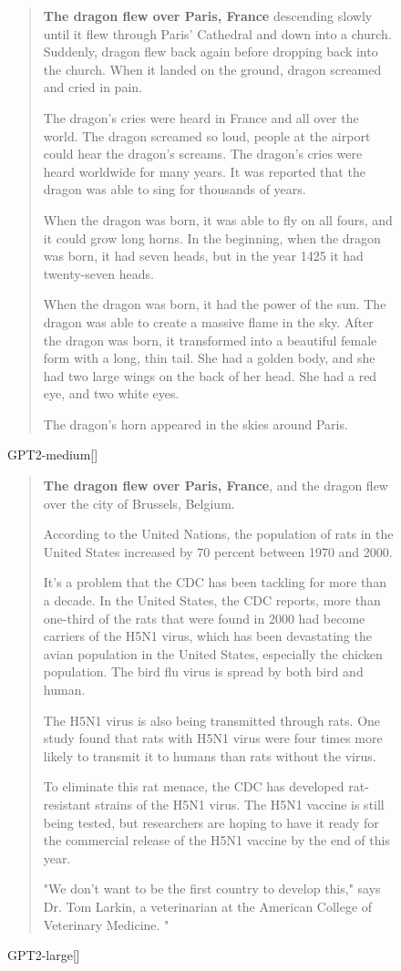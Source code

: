\documentclass{article}
\begin{document}
\begin{figure}
    \begin{quote}
\textbf{The dragon flew over Paris, France} descending slowly until it flew through Paris' Cathedral and down into a church. Suddenly, dragon flew back again before dropping back into the church. When it landed on the ground, dragon screamed and cried in pain.

The dragon's cries were heard in France and all over the world. The dragon screamed so loud, people at the airport could hear the dragon's screams. The dragon's cries were heard worldwide for many years. It was reported that the dragon was able to sing for thousands of years.

When the dragon was born, it was able to fly on all fours, and it could grow long horns. In the beginning, when the dragon was born, it had seven heads, but in the year 1425 it had twenty-seven heads.

When the dragon was born, it had the power of the sun. The dragon was able to create a massive flame in the sky. After the dragon was born, it transformed into a beautiful female form with a long, thin tail. She had a golden body, and she had two large wings on the back of her head. She had a red eye, and two white eyes.

The dragon's horn appeared in the skies around Paris.
    \end{quote}
    \caption{GPT2-medium[]}
    \label{fig:koala-gpt2-medium-cfg=1.5}
\end{figure}

\begin{figure}
    \begin{quote}
\textbf{The dragon flew over Paris, France}, and the dragon flew over the city of Brussels, Belgium.

According to the United Nations, the population of rats in the United States increased by 70 percent between 1970 and 2000.

It's a problem that the CDC has been tackling for more than a decade. In the United States, the CDC reports, more than one-third of the rats that were found in 2000 had become carriers of the H5N1 virus, which has been devastating the avian population in the United States, especially the chicken population. The bird flu virus is spread by both bird and human.

The H5N1 virus is also being transmitted through rats. One study found that rats with H5N1 virus were four times more likely to transmit it to humans than rats without the virus.

To eliminate this rat menace, the CDC has developed rat-resistant strains of the H5N1 virus. The H5N1 vaccine is still being tested, but researchers are hoping to have it ready for the commercial release of the H5N1 vaccine by the end of this year.

"We don't want to be the first country to develop this," says Dr. Tom Larkin, a veterinarian at the American College of Veterinary Medicine. "
    \end{quote}
    \caption{GPT2-large[]}
    \label{fig:koala-gpt2-large-cfg=1}
\end{figure}
\end{document}
